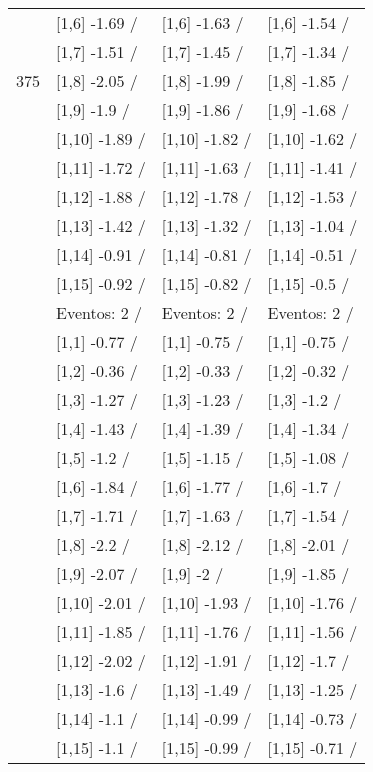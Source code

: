 \begin{table}
\begin{tabular}[t]{llll}
 & {}[1,6] -1.69  / & {}[1,6] -1.63  / & {}[1,6] -1.54  /\\
 & {}[1,7] -1.51  / & {}[1,7] -1.45  / & {}[1,7] -1.34  /\\
375 & {}[1,8] -2.05  / & {}[1,8] -1.99  / & {}[1,8] -1.85  /\\
\addlinespace
 & {}[1,9] -1.9  / & {}[1,9] -1.86  / & {}[1,9] -1.68  /\\
 & {}[1,10] -1.89  / & {}[1,10] -1.82  / & {}[1,10] -1.62  /\\
 & {}[1,11] -1.72  / & {}[1,11] -1.63  / & {}[1,11] -1.41  /\\
 & {}[1,12] -1.88  / & {}[1,12] -1.78  / & {}[1,12] -1.53  /\\
 & {}[1,13] -1.42  / & {}[1,13] -1.32  / & {}[1,13] -1.04  /\\
\addlinespace
 & {}[1,14] -0.91  / & {}[1,14] -0.81  / & {}[1,14] -0.51  /\\
 & {}[1,15] -0.92  / & {}[1,15] -0.82  / & {}[1,15] -0.5  /\\
 & Eventos:  2 / & Eventos:  2 / & Eventos:  2 /\\
 & {}[1,1] -0.77  / & {}[1,1] -0.75  / & {}[1,1] -0.75  /\\
 & {}[1,2] -0.36  / & {}[1,2] -0.33  / & {}[1,2] -0.32  /\\
\addlinespace
 & {}[1,3] -1.27  / & {}[1,3] -1.23  / & {}[1,3] -1.2  /\\
 & {}[1,4] -1.43  / & {}[1,4] -1.39  / & {}[1,4] -1.34  /\\
 & {}[1,5] -1.2  / & {}[1,5] -1.15  / & {}[1,5] -1.08  /\\
 & {}[1,6] -1.84  / & {}[1,6] -1.77  / & {}[1,6] -1.7  /\\
 & {}[1,7] -1.71  / & {}[1,7] -1.63  / & {}[1,7] -1.54  /\\
\addlinespace
500 & {}[1,8] -2.2  / & {}[1,8] -2.12  / & {}[1,8] -2.01  /\\
 & {}[1,9] -2.07  / & {}[1,9] -2  / & {}[1,9] -1.85  /\\
 & {}[1,10] -2.01  / & {}[1,10] -1.93  / & {}[1,10] -1.76  /\\
 & {}[1,11] -1.85  / & {}[1,11] -1.76  / & {}[1,11] -1.56  /\\
 & {}[1,12] -2.02  / & {}[1,12] -1.91  / & {}[1,12] -1.7  /\\
\addlinespace
 & {}[1,13] -1.6  / & {}[1,13] -1.49  / & {}[1,13] -1.25  /\\
 & {}[1,14] -1.1  / & {}[1,14] -0.99  / & {}[1,14] -0.73  /\\
 & {}[1,15] -1.1  / & {}[1,15] -0.99  / & {}[1,15] -0.71  /\\
\bottomrule
\end{tabular}
\end{table}
